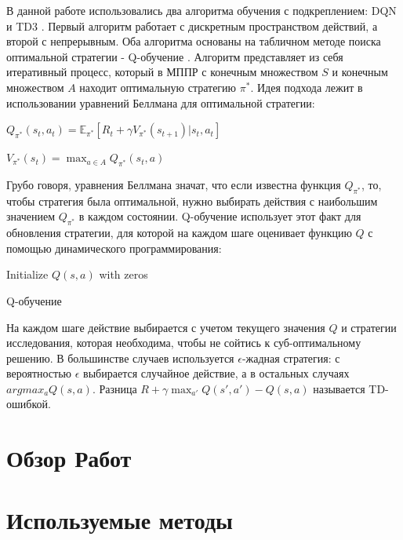 \documentclass{mipt-thesis-bs}
\begin{document}
В данной работе использовались два алгоритма обучения с подкреплением: DQN \cite{dqn} и TD3 \cite{td3}. Первый алгоритм работает с дискретным пространством действий, а второй с непрерывным. Оба алгоритма основаны на табличном методе поиска оптимальной стратегии - Q-обучение \cite{Q-learning}. Алгоритм представляет из себя итеративный процесс, который в МППР с конечным множеством $S$ и конечным множеством $A$ находит оптимальную стратегию $\pi^*$. Идея подхода лежит в использовании уравнений Беллмана для оптимальной стратегии:
\begin{center}
$Q_{\pi^*}(s_t, a_t) = \mathbb{E}_{\pi^*}[R_{t} + \gamma V_{\pi^*}(s_{t+1})| s_t, a_t]$

$V_{\pi^*}(s_t) = \max_{a\in A}Q_{\pi^*}(s_t, a)$
\end{center}

Грубо говоря, уравнения Беллмана значат, что если известна функция $Q_{\pi^*}$, то, чтобы стратегия была оптимальной, нужно выбирать действия с наибольшим значением $Q_{\pi^*}$ в каждом состоянии. Q-обучение использует этот факт для обновления стратегии, для которой на каждом шаге оценивает функцию $Q$ с помощью динамического программирования: 

\begin{algorithm}[H]
\SetAlgoLined
Initialize $Q(s, a)$ with zeros\;
\caption{Q-обучение}
\end{algorithm}

На каждом шаге действие выбирается с учетом текущего значения $Q$ и стратегии исследования, которая необходима, чтобы не сойтись к суб-оптимальному решению. В большинстве случаев используется $\epsilon$-жадная стратегия: с вероятностью $\epsilon$ выбирается случайное действие, а в остальных случаях $argmax_aQ(s,a)$. Разница $R+\gamma \max _{a'} Q(s', a')-Q(s, a)$ называется TD-ошибкой.

\chapter{Обзор Работ}

\chapter{Используемые методы}
\end{document}
